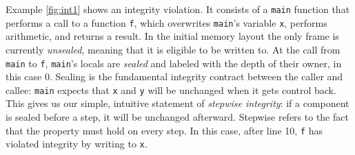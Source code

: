 \documentclass[acmsmall,review,anonymous]{acmart}\settopmatter{printfolios=true,printccs=false,printacmref=false}
\begin{document}
Example \ref{fig:int1} shows an integrity violation. It consists of a {\tt main}
function that performs a call to a function {\tt f}, which overwrites {\tt main}'s
variable {\tt x}, performs arithmetic, and returns a result.
In the initial memory layout the only frame is currently {\em unsealed},
meaning that it is eligible to be written to. At the call from {\tt main} to
{\tt f}, {\tt main}'s locals are {\em sealed} and labeled with the depth of their owner,
in this case 0. Sealing is the fundamental integrity contract between the caller and callee:
{\tt main} expects that {\tt x} and {\tt y} will be unchanged when it gets control back.
This gives us our simple, intuitive statement of {\em stepwise integrity}:
if a component is sealed before a step, it will be unchanged afterward. Stepwise
refers to the fact that the property must hold on every step. %
In this case, after line 10, {\tt f} has violated integrity by writing to {\tt x}.
\end{document}
